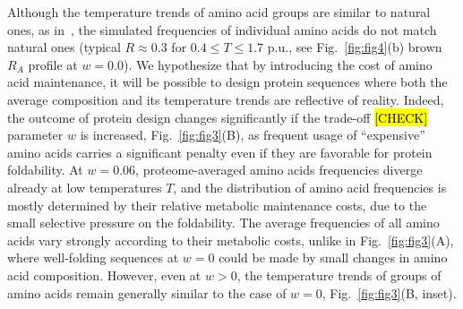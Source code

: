 \documentclass[10pt,letterpaper]{article}
\begin{document}
Although the temperature trends of amino acid groups are similar to natural ones, as in~\cite{Berezovsky2007Positive}, the simulated frequencies of individual amino acids do not match natural ones (typical $R\approx0.3$ for $0.4\leq T\leq 1.7$ p.u., see Fig.~\ref{fig:fig4}(b) brown  $R_A$ profile at $w=0.0$).  We hypothesize that by introducing the cost of amino acid maintenance, it will be possible to design protein sequences where both the average composition and its temperature trends are reflective of reality. Indeed, the outcome of protein design changes significantly if the  trade-off \hl{[CHECK]} parameter $w$ is increased, Fig.~\ref{fig:fig3}(B), as frequent usage of  ``expensive'' amino acids carries a significant penalty even if they are favorable for protein foldability.
At $w=0.06$, proteome-averaged amino acids frequencies diverge already at low temperatures $T$, 
and the distribution of amino acid frequencies is mostly determined by their relative metabolic maintenance costs, due to the small selective pressure on the foldability. The average frequencies of all amino acids vary strongly according to their metabolic costs, unlike in Fig.~\ref{fig:fig3}(A), where well-folding sequences at $w=0$ could be made by small changes in amino acid composition. However, even at $w>0$, the temperature trends of groups of amino acids remain generally similar to the case of $w=0$, Fig.~\ref{fig:fig3}(B, inset).
\end{document}
